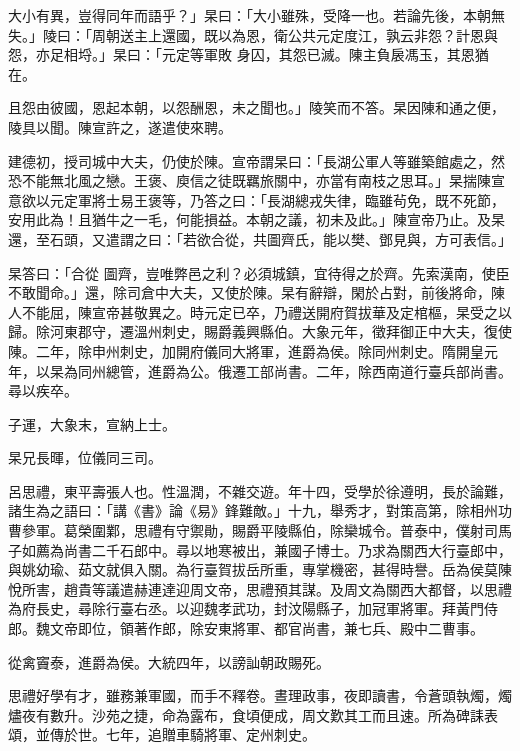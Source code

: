 \begin{pinyinscope}
 大小有異，豈得同年而語乎？」杲曰：「大小雖殊，受降一也。若論先後，本朝無失。」陵曰：「周朝送主上還國，既以為恩，衛公共元定度江，孰云非怨？計恩與怨，亦足相埒。」杲曰：「元定等軍敗
 身囚，其怨已滅。陳主負扆馮玉，其恩猶在。



 且怨由彼國，恩起本朝，以怨酬恩，未之聞也。」陵笑而不答。杲因陳和通之便，陵具以聞。陳宣許之，遂遣使來聘。



 建德初，授司城中大夫，仍使於陳。宣帝謂杲曰：「長湖公軍人等雖築館處之，然恐不能無北風之戀。王褒、庾信之徒既羈旅關中，亦當有南枝之思耳。」杲揣陳宣意欲以元定軍將士易王褒等，乃答之曰：「長湖總戎失律，臨雖茍免，既不死節，安用此為！且猶牛之一毛，何能損益。本朝之議，初未及此。」陳宣帝乃止。及杲還，至石頭，又遣謂之曰：「若欲合從，共圖齊氏，能以樊、鄧見與，方可表信。」



 杲答曰：「合從
 圖齊，豈唯弊邑之利？必須城鎮，宜待得之於齊。先索漢南，使臣不敢聞命。」還，除司倉中大夫，又使於陳。杲有辭辯，閑於占對，前後將命，陳人不能屈，陳宣帝甚敬異之。時元定已卒，乃禮送開府賀拔華及定棺樞，杲受之以歸。除河東郡守，遷溫州刺史，賜爵義興縣伯。大象元年，徵拜御正中大夫，復使陳。二年，除申州刺史，加開府儀同大將軍，進爵為侯。除同州刺史。隋開皇元年，以杲為同州總管，進爵為公。俄遷工部尚書。二年，除西南道行臺兵部尚書。尋以疾卒。



 子運，大象末，宣納上士。



 杲兄長暉，位儀同三司。



 呂思禮，東平壽張人也。性溫潤，不雜交遊。年十四，受學於徐遵明，長於論難，諸生為之語曰：「講《書》論《易》鋒難敵。」十九，舉秀才，對策高第，除相州功曹參軍。葛榮圍鄴，思禮有守禦勛，賜爵平陵縣伯，除欒城令。普泰中，僕射司馬子如薦為尚書二千石郎中。尋以地寒被出，兼國子博士。乃求為關西大行臺郎中，與姚幼瑜、茹文就俱入關。為行臺賀拔岳所重，專掌機密，甚得時譽。岳為侯莫陳悅所害，趙貴等議遣赫連達迎周文帝，思禮預其謀。及周文為關西大都督，以思禮為府長史，尋除行臺右丞。以迎魏孝武功，封汶陽縣子，加冠軍將軍。拜黃門侍
 郎。魏文帝即位，領著作郎，除安東將軍、都官尚書，兼七兵、殿中二曹事。



 從禽竇泰，進爵為侯。大統四年，以謗訕朝政賜死。



 思禮好學有才，雖務兼軍國，而手不釋卷。晝理政事，夜即讀書，令蒼頭執燭，燭燼夜有數升。沙苑之捷，命為露布，食頃便成，周文歎其工而且速。所為碑誄表頌，並傳於世。七年，追贈車騎將軍、定州刺史。




\end{pinyinscope}
